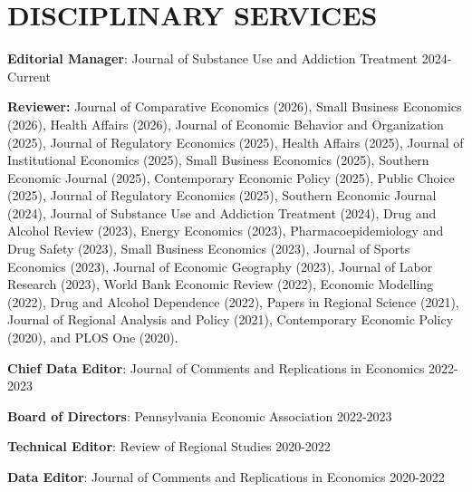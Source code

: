 \section*{DISCIPLINARY SERVICES}
\begin{list1}
\item[] \textbf{Editorial Manager}: Journal of Substance Use and Addiction Treatment \hfill 2024-Current
\item[] \textbf{Reviewer:} Journal of Comparative Economics (2026), Small Business Economics (2026), Health Affairs (2026), Journal of Economic Behavior and Organization (2025), Journal of Regulatory Economics (2025), Health Affairs (2025), Journal of Institutional Economics (2025), Small Business Economics (2025), Southern Economic Journal (2025), Contemporary Economic Policy (2025), Public Choice (2025), Journal of Regulatory Economics (2025), Southern Economic Journal (2024), Journal of Substance Use and Addiction Treatment (2024), Drug and Alcohol Review (2023), Energy Economics (2023), Pharmacoepidemiology and Drug Safety (2023), Small Business Economics (2023), Journal of Sports Economics (2023), Journal of Economic Geography (2023), Journal of Labor Research (2023), World Bank Economic Review (2022), Economic Modelling (2022), Drug and Alcohol Dependence (2022), Papers in Regional Science (2021), Journal of Regional Analysis and Policy (2021), Contemporary Economic Policy (2020), and PLOS One (2020).
\item[] \textbf{Chief Data Editor}: Journal of Comments and Replications in Economics \hfill 2022-2023
\item[] \textbf{Board of Directors}: Pennsylvania Economic Association \hfill 2022-2023
\item[] \textbf{Technical Editor}: Review of Regional Studies \hfill 2020-2022
\item[] \textbf{Data Editor}: Journal of Comments and Replications in Economics \hfill 2020-2022
\end{list1}

